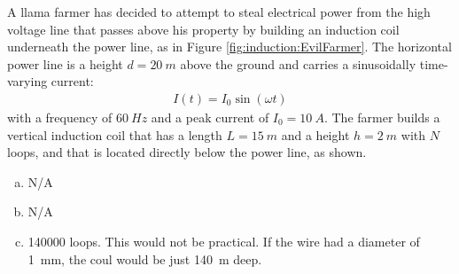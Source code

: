 \question A llama farmer has decided to attempt to steal electrical power from the high voltage line that passes above his property by building an induction coil underneath the power line, as in Figure \ref{fig:induction:EvilFarmer}. The horizontal power line is a height $d=\SI{20}{m}$ above the ground and carries a sinusoidally time-varying current:
\begin{align*}
I(t)=I_0\sin(\omega t)
\end{align*}
with a frequency of $\SI{60}{Hz}$ and a peak current of $I_0=\SI{10}{A}$. The farmer builds a vertical induction coil that has a length $L=\SI{15}{m}$ and a height $h=\SI{2}{m}$ with $N$ loops, and that is located directly below the power line, as shown.
\begin{finalanswer}
\begin{enumerate}[(a)]
\item N/A
\item N/A
\item 140000 loops. This would not be practical. If the wire had a diameter of \SI{1}{mm}, the coul would be just \SI{140}{m} deep.
\end{enumerate}
\end{finalanswer}
